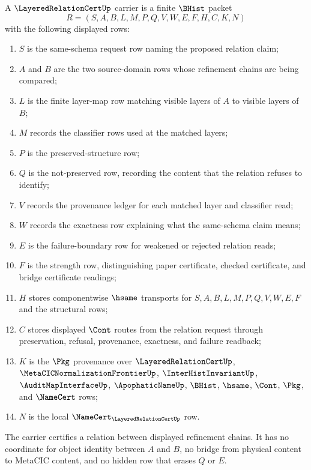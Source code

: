 \begin{definition}
\label{def:layered-relation-namecert-carrier}
A $\LayeredRelationCertUp$ carrier is a finite $\BHist$ packet
$$
R=(S,A,B,L,M,P,Q,V,W,E,F,H,C,K,N)
$$
with the following displayed rows:
\begin{enumerate}
\item $S$ is the same-schema request row naming the proposed relation claim;
\item $A$ and $B$ are the two source-domain rows whose refinement chains are being compared;
\item $L$ is the finite layer-map row matching visible layers of $A$ to visible layers of $B$;
\item $M$ records the classifier rows used at the matched layers;
\item $P$ is the preserved-structure row;
\item $Q$ is the not-preserved row, recording the content that the relation refuses to identify;
\item $V$ records the provenance ledger for each matched layer and classifier read;
\item $W$ records the exactness row explaining what the same-schema claim means;
\item $E$ is the failure-boundary row for weakened or rejected relation reads;
\item $F$ is the strength row, distinguishing paper certificate, checked certificate, and bridge certificate readings;
\item $H$ stores componentwise $\hsame$ transports for $S,A,B,L,M,P,Q,V,W,E,F$ and the structural rows;
\item $C$ stores displayed $\Cont$ routes from the relation request through preservation, refusal, provenance, exactness, and failure readback;
\item $K$ is the $\Pkg$ provenance over $\LayeredRelationCertUp$, $\MetaCICNormalizationFrontierUp$, $\InterHistInvariantUp$, $\AuditMapInterfaceUp$, $\ApophaticNameUp$, $\BHist$, $\hsame$, $\Cont$, $\Pkg$, and $\NameCert$ rows;
\item $N$ is the local $\NameCert_{\LayeredRelationCertUp}$ row.
\end{enumerate}
The carrier certifies a relation between displayed refinement chains. It has no coordinate for object identity between $A$ and $B$, no bridge from physical content to MetaCIC content, and no hidden row that erases $Q$ or $E$.
\end{definition}

